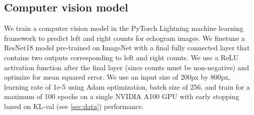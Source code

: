 \subsection{Computer vision model}

We train a computer vision model in the PyTorch Lightning machine learning framework to predict left and right counts for echogram images. We finetune a ResNet18 model pre-trained on ImageNet with a final fully connected layer that contains two outputs corresponding to left and right counts. We use a ReLU activation function after the final layer (since counts must be non-negative) and optimize for mean squared error. %
We use an input size of 200px by 800px, learning rate of 1e-5 using Adam optimization, batch size of 256, and train for a maximum of 100 epochs on a single NVIDIA A100 GPU with early stopping based on KL-val (see \cref{sec:data}) performance.